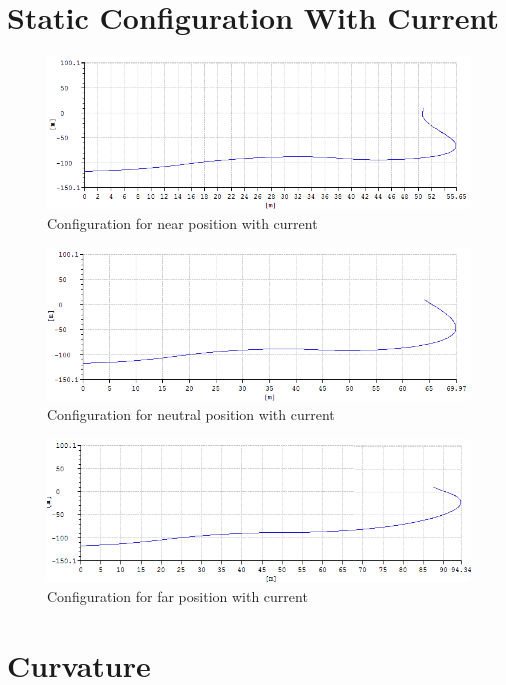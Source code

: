 \section{Static Configuration With Current}
\begin{figure}[H]
\centering
\includegraphics[scale=0.5]{figures/confignearc}
\caption{Configuration for near position with current}
 \label{fig:confignear}
\end{figure}

\begin{figure}[H]
\centering
\includegraphics[scale=0.5]{figures/configneuc}
\caption{Configuration for neutral position with current}
 \label{fig:configneu}
\end{figure}

\begin{figure}[H]
\centering
\includegraphics[scale=0.5]{figures/configfarc}
\caption{Configuration for far position with current}
 \label{fig:configfar}
\end{figure}

\section{Curvature}

